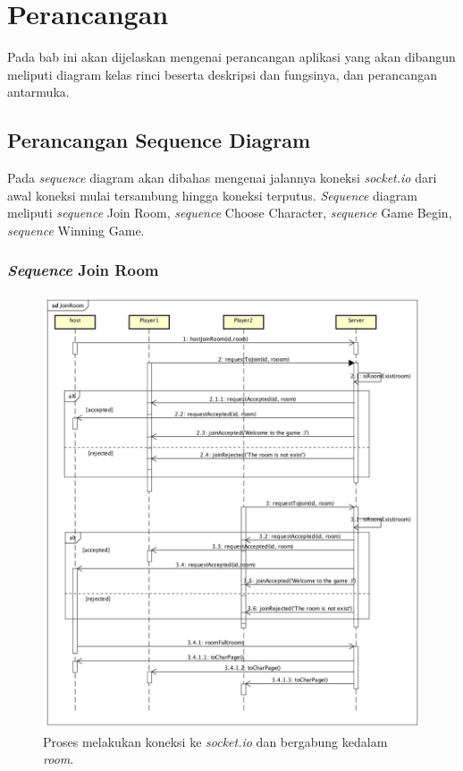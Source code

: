 \chapter{Perancangan}
\label{chap:perancangan}

Pada bab ini akan dijelaskan mengenai perancangan aplikasi yang akan dibangun meliputi diagram kelas rinci beserta deskripsi dan fungsinya, dan perancangan antarmuka.

\section{Perancangan Sequence Diagram}

Pada \textit{sequence} diagram akan dibahas mengenai jalannya koneksi \textit{socket.io} dari awal koneksi mulai tersambung hingga koneksi terputus. \textit{Sequence} diagram meliputi \textit{sequence} Join Room, \textit{sequence} Choose Character, \textit{sequence} Game Begin, \textit{sequence} Winning Game.

\subsection{\textit{Sequence} Join Room}

\begin{figure}[H]
	\centering
	\includegraphics[scale=0.3]{Gambar/JoinRoom}
	\caption{Proses melakukan koneksi ke \textit{socket.io} dan bergabung kedalam \textit{room}.}
	\label{fig:1_JoinRoom}
\end{figure}

